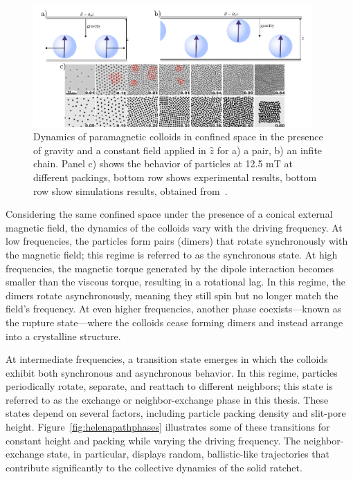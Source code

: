 \begin{figure}
  \begin{center}
    \includegraphics[width=0.95\textwidth]{figures/colloidsdynamics2.pdf}
  \end{center}
  \caption[Dinamycs of paramagnetic colloids in a confined space.]{Dynamics of paramagnetic colloids in confined space in the presence of gravity and a constant field applied in $\hat{z}$ for a) a pair, b) an infite chain. Panel c) shows the behavior of particles at 12.5 mT at different packings, bottom row shows experimental results, bottom row show simulations results, obtained from~\cite{osterman2007observation}.}\label{fig:colloidsconfined}
\end{figure}

Considering the same confined space under the presence of a conical external magnetic field, the dynamics of the colloids vary with the driving frequency. At low frequencies, the particles form pairs (dimers) that rotate synchronously with the magnetic field; this regime is referred to as the synchronous state. At high frequencies, the magnetic torque generated by the dipole interaction becomes smaller than the viscous torque, resulting in a rotational lag. In this regime, the dimers rotate asynchronously, meaning they still spin but no longer match the field’s frequency. At even higher frequencies, another phase coexists—known as the rupture state—where the colloids cease forming dimers and instead arrange into a crystalline structure.

At intermediate frequencies, a transition state emerges in which the colloids exhibit both synchronous and asynchronous behavior. In this regime, particles periodically rotate, separate, and reattach to different neighbors; this state is referred to as the exchange or neighbor-exchange phase in this thesis. These states depend on several factors, including particle packing density and slit-pore height. Figure~\ref{fig:helenapathphases} illustrates some of these transitions for constant height and packing while varying the driving frequency. The neighbor-exchange state, in particular, displays random, ballistic-like trajectories that contribute significantly to the collective dynamics of the solid ratchet.

